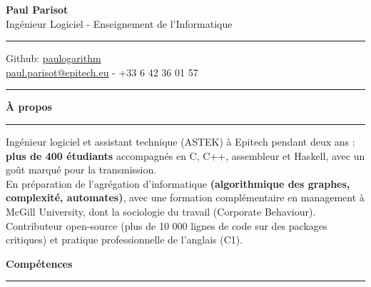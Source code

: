 \documentclass[9pt]{extarticle}
\begin{document}
\begin{center}
	{\huge\bfseries Paul Parisot}
	\\[4pt]
	{\Large Ingénieur Logiciel - Enseignement de l'Informatique}
	\\
\end{center}


\par\vspace{-5pt}
\rule{\linewidth}{0.4pt}
\par\vspace{-5pt}

\begin{center}
	Github: \href{https://github.com/paulogarithm}{paulogarithm}
	\\
	\href{mailto:paul.parisot@epitech.eu}{paul.parisot@epitech.eu} - +33 6 42 36 01 57
	\\
\end{center}

\par\vspace{-10pt}
\rule{\linewidth}{0.4pt}
\par\vspace{7pt}


{\large\bfseries À propos}
\par\vspace{-8pt}
\rule{\linewidth}{0.4pt}
\par\vspace{5pt}

Ingénieur logiciel et assistant technique (ASTEK) à Epitech pendant deux ans : {\bfseries plus de 400 étudiants} accompagnés en C, C++, assembleur et Haskell, avec un goût marqué pour la transmission.
\\
En préparation de l'agrégation d'informatique {\bfseries (algorithmique des graphes, complexité, automates)}, avec une formation complémentaire en management à McGill University, dont la sociologie du travail (Corporate Behaviour).
\\
Contributeur open-source (plus de 10 000 lignes de code sur des packages critiques) et pratique professionnelle de l'anglais (C1).
\par\vspace{5pt}


{\large\bfseries Compétences}
\par\vspace{-8pt}
\rule{\linewidth}{0.4pt}
\par\vspace{5pt}
\end{document}
